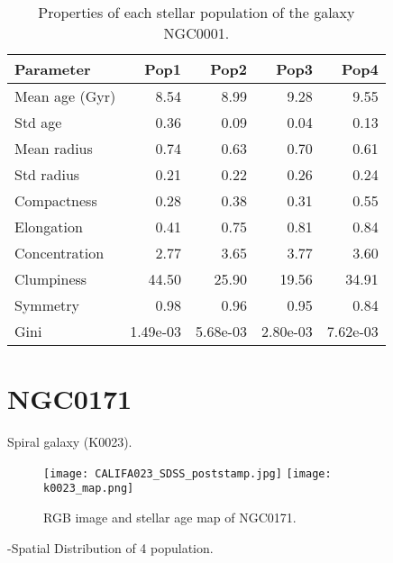 \begin{table}[h]
\centering
\begin{tabular}{l|r|r|r|r}
Parameter & Pop1 & Pop2 & Pop3 & Pop4 \\\hline
Mean age (Gyr) &  8.54 & 8.99 & 9.28 & 9.55 \\
Std age & 0.36 & 0.09 & 0.04 & 0.13  \\
Mean radius & 0.74 & 0.63 & 0.70 & 0.61 \\
Std radius & 0.21 & 0.22 & 0.26 & 0.24 \\
Compactness & 0.28 & 0.38 & 0.31 & 0.55 \\
Elongation & 0.41 & 0.75 & 0.81 & 0.84 \\
Concentration & 2.77 & 3.65 & 3.77 & 3.60  \\
Clumpiness & 44.50 & 25.90 & 19.56 & 34.91 \\
Symmetry & 0.98 & 0.96 & 0.95 & 0.84 \\
Gini & 1.49e-03 & 5.68e-03 & 2.80e-03 & 7.62e-03 \\
\end{tabular}
\caption{\label{tab:widgets}Properties of each stellar population of the galaxy NGC0001.}
\end{table}


\newpage
\section*{NGC0171}
Spiral galaxy (K0023).

\begin{figure}[bh]
\begin{center}
\texttt{[image: CALIFA023\_SDSS\_poststamp.jpg]}
\texttt{[image: k0023\_map.png]}
\caption{RGB image and stellar age map of NGC0171.}
   \label{fig1}
\end{center}
\end{figure}

-Spatial Distribution of 4 population.

